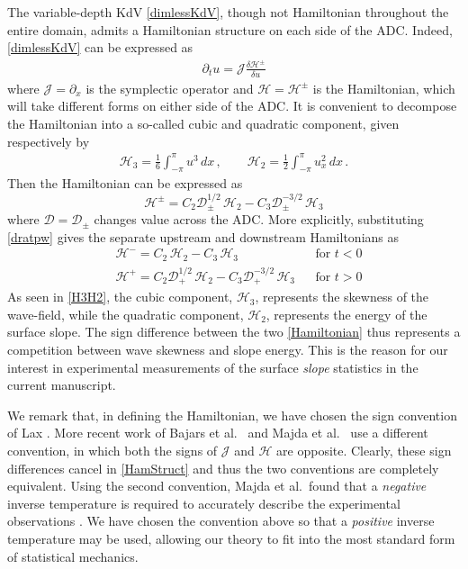 \documentclass[11pt]{article}
\newcommand{\pdi}[2] { {\partial_#2} #1 }
\newcommand{\dx}{\, dx}
\newcommand{\drat}{\mathcal{D}}
\newcommand{\dratdn}{\drat_+}
\newcommand{\dratupdn}{\drat_{\pm}}
\newcommand{\sympJ}{\mathcal{J}}
\newcommand{\vard}[2]{\frac{\delta #1}{\delta #2}}
\newcommand{\Ham}{\mathcal{H}}
\newcommand{\Hup}{\Ham^{-}}
\newcommand{\Hdn}{\Ham^{+}}
\newcommand{\Hupdn}{\Ham^{\pm}}
\newcommand{\Hthree}{\Ham_{3}}
\newcommand{\Htwo}{\Ham_{2}}
\begin{document}
The variable-depth KdV \eqref{dimlessKdV}, though not Hamiltonian throughout the entire domain, admits a Hamiltonian structure on each side of the ADC. Indeed, \eqref{dimlessKdV} can be expressed as
\begin{align}
\label{HamStruct}
\partial_t{u} = \sympJ \vard{\Hupdn}{u}
\end{align}
where $\sympJ = \pdi{}{x}$ is the symplectic operator and $\Ham = \Hupdn$ is the Hamiltonian, which will take different forms on either side of the ADC. It is convenient to decompose the Hamiltonian into a so-called cubic and quadratic component, given respectively by
\begin{align}
\label{H3H2}
\Hthree = \frac{1}{6} \int_{-\pi}^{\pi} u^3 \dx	\, , \qquad
\Htwo = \frac{1}{2} \int_{-\pi}^{\pi} u_x^2 \dx	\, .
\end{align}
Then the Hamiltonian can be expressed as
\begin{equation}
\label{Hamiltonian}
\Hupdn = C_2 \dratupdn^{1/2} \, \Htwo - C_3 \dratupdn^{-3/2} \, \Hthree
\end{equation}
where $\drat = \dratupdn$ changes value across the ADC. More explicitly, substituting \eqref{dratpw} gives the separate upstream and downstream Hamiltonians as
\begin{align}
&\Hup = C_2 \, \Htwo - C_3 \, \Hthree 						&& \text{for } t<0 \\
&\Hdn = C_2 \dratdn^{1/2} \, \Htwo - C_3 \dratdn^{-3/2} \, \Hthree	&& \text{for } t>0
\end{align}
As seen in \eqref{H3H2}, the cubic component, $\Hthree$, represents the skewness of the wave-field, while the quadratic component, $\Htwo$, represents the energy of the surface slope. The sign difference between the two \eqref{Hamiltonian} thus represents a competition between wave skewness and slope energy. This is the reason for our interest in experimental measurements of the surface {\it slope} statistics in the current manuscript.

We remark that, in defining the Hamiltonian, we have chosen the sign convention of Lax \cite{lax1975periodic}. More recent work of Bajars et al.~\cite{bajars2013weakly} and Majda et al.~\cite{majda2019} use a different convention, in which both the signs of $\sympJ$ and $\Ham$ are opposite. Clearly, these sign differences cancel in \eqref{HamStruct} and thus the two conventions are completely equivalent. Using the second convention, Majda et al.~found that a {\em negative} inverse temperature is required to accurately describe the experimental observations \cite{majda2019}. We have  chosen the convention above so that a {\em positive} inverse temperature may be used, allowing our theory to fit into the most standard form of statistical mechanics.
\end{document}
